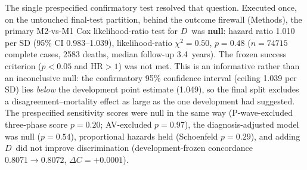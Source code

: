 \documentclass[11pt]{article}
\newcommand{\D}{\ensuremath{D}}
\begin{document}
The single prespecified confirmatory test resolved that question. Executed once, on
the untouched final-test partition, behind the outcome firewall (Methods), the primary
M2-vs-M1 Cox likelihood-ratio test for \D\ was \textbf{null}: hazard ratio \num{1.010}
per SD (95\% CI \numrange{0.983}{1.039}), likelihood-ratio $\chi^2=\num{0.50}$,
$p=\num{0.48}$ ($n=\num{74715}$ complete cases, \num{2583} deaths, median follow-up
\num{3.4}~years). The frozen success criterion ($p<\num{0.05}$ and $\text{HR}>1$) was
not met. This is an informative rather than an inconclusive null: the confirmatory 95\%
confidence interval (ceiling \num{1.039} per SD) lies \emph{below} the development point
estimate (\num{1.049}), so the final split excludes a disagreement--mortality effect as
large as the one development had suggested. The prespecified sensitivity scores were
null in the same way (P-wave-excluded three-phase score $p=\num{0.20}$; AV-excluded
$p=\num{0.97}$), the diagnosis-adjusted model was null ($p=\num{0.54}$), proportional
hazards held (Schoenfeld $p=\num{0.29}$), and adding \D\ did not improve discrimination
(development-frozen concordance $\num{0.8071}\!\to\!\num{0.8072}$, $\Delta C=+\num{0.0001}$).
\end{document}
